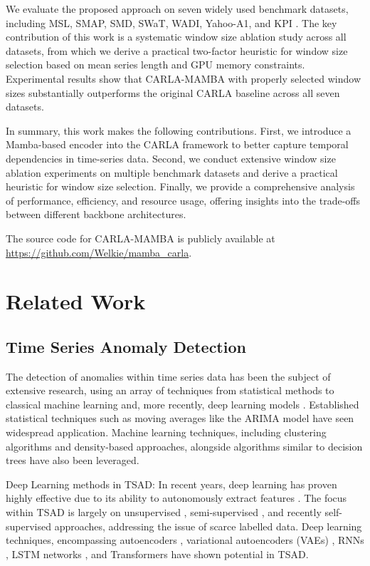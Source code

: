 \documentclass[runningheads]{llncs}
\begin{document}
We evaluate the proposed approach on seven widely used benchmark datasets, including MSL, SMAP, SMD, SWaT, WADI, Yahoo-A1, and KPI \cite{hundman2018detecting,su2019robust,mathur2016swat,ahmed2017wadi,laptev2015benchmark}. The key contribution of this work is a systematic window size ablation study across all datasets, from which we derive a practical two-factor heuristic for window size selection based on mean series length and GPU memory constraints. Experimental results show that CARLA-MAMBA with properly selected window sizes substantially outperforms the original CARLA baseline across all seven datasets.

In summary, this work makes the following contributions. First, we introduce a Mamba-based encoder into the CARLA framework to better capture temporal dependencies in time-series data. Second, we conduct extensive window size ablation experiments on multiple benchmark datasets and derive a practical heuristic for window size selection. Finally, we provide a comprehensive analysis of performance, efficiency, and resource usage, offering insights into the trade-offs between different backbone architectures.

The source code for CARLA-MAMBA is publicly available at 
\url{https://github.com/Welkie/mamba_carla}.

\section{Related Work}

\subsection{Time Series Anomaly Detection}
\label{sec:related_tsad}

The detection of anomalies within time series data has been the subject of extensive research, using an array of techniques from statistical methods to classical machine learning and, more recently, deep learning models \cite{schmidl2022anomaly}. Established statistical techniques such as moving averages like the ARIMA model \cite{box1970distribution} have seen widespread application. Machine learning techniques, including clustering algorithms and density-based approaches, alongside algorithms similar to decision trees \cite{liu2008isolation} have also been leveraged.

Deep Learning methods in TSAD: In recent years, deep learning has proven highly effective due to its ability to autonomously extract features \cite{pang2021deep}. The focus within TSAD is largely on unsupervised \cite{hundman2018detecting}, semi-supervised \cite{park2018multimodal}, and recently self-supervised \cite{yue2022ts2vec} approaches, addressing the issue of scarce labelled data. Deep learning techniques, encompassing autoencoders \cite{yao2023regularizing}, variational autoencoders (VAEs) \cite{park2018multimodal}, RNNs \cite{su2019robust}, LSTM networks \cite{hundman2018detecting}, and Transformers \cite{tuli2022tranad,xu2021anomaly} have shown potential in TSAD.
\end{document}
